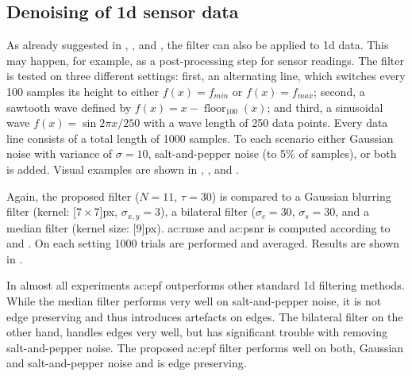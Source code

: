 \subsection{Denoising of 1d sensor data}

As already suggested in , , and , the filter can also be applied to 1d data. 
This may happen, for example, as a post-processing step for sensor readings. 
The filter is tested on three different settings: first, an alternating line, which switches every 100 samples its height to either $f(x) = f_{min}$ or $f(x) = f_{max}$; second, a sawtooth wave defined by $f(x) = x - \operatorname{floor}_{100}(x)$; and third, a sinusoidal wave $f(x) = \sin{2 \pi x / 250}$ with a wave length of 250 data points.
Every data line consists of a total length of 1000 samples.
To each scenario either Gaussian noise with variance of $\sigma = 10$, salt-and-pepper noise (to 5\% of samples), or both is added. 
Visual examples are shown in , , and .

Again, the proposed filter ($N = 11$, $\tau = 30$) is compared to a Gaussian blurring filter (kernel: \unit[$7 \times 7$]{px}, $\sigma_{x,y} = 3$), a bilateral filter ($\sigma_c = 30$, $\sigma_s = 30$, and a median filter (kernel size: \unit[$9$]{px}). 
\gls{ac:rmse} and \gls{ac:psnr} is computed according to  and .
On each setting 1000 trials are performed and averaged.
Results are shown in .

In almost all experiments \gls{ac:epf} outperforms other standard 1d filtering methods.
While the median filter performs very well on salt-and-pepper noise, it is not edge preserving and thus introduces artefacts on edges.
The bilateral filter on the other hand, handles edges very well, but has significant trouble with removing salt-and-pepper noise.
The proposed \gls{ac:epf} filter performs well on both, Gaussian and salt-and-pepper noise and is edge preserving.

